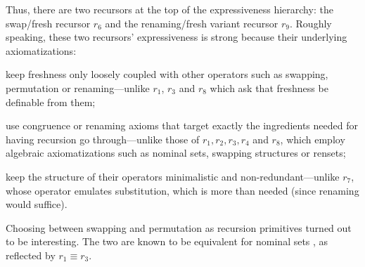Thus, there are two recursors %
at the top of the expressiveness hierarchy: %
the swap/fresh recursor $r_6$ and the renaming/fresh variant recursor $r_9$. %
Roughly speaking, these two recursors' expressiveness is strong because their underlying axiomatizations:
\begin{mmyitem}
\item keep freshness only loosely coupled with other operators 
such as swapping, permutation or renaming---unlike $r_1$, $r_3$ and $r_8$ which ask that freshness be definable from them; %
%
\item use congruence or renaming axioms that target exactly the ingredients needed for having recursion go through---unlike those of $r_1,r_2,r_3,r_4$ and $r_8$, which employ 
algebraic axiomatizations %
such as %
nominal sets, swapping structures or rensets;
%
\item keep the structure of their operators minimalistic and non-redundant---unlike $r_7$, whose operator emulates substitution, which is more than needed (since renaming would suffice). 
\end{mmyitem} 


Choosing between swapping and permutation as recursion primitives 
turned out to be interesting. 
 The two %
 are known to be equivalent %
 for nominal sets \cite[\S6.1]{pitts_2013}, as reflected by %
 $r_1 \equiv r_3$.  
 
